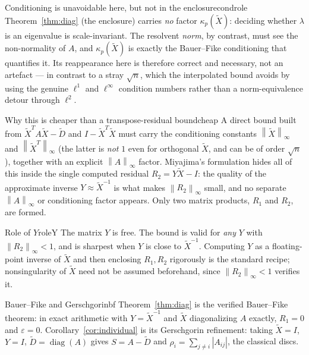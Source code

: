\documentclass[11pt, a4paper]{article}
\numberwithin{equation}{section}
\newcommand{\norm}[1]{\left\|#1\right\|}
\newcommand{\abs}[1]{\left|#1\right|}
\newcommand{\tX}{\widetilde{X}}
\newcommand{\tD}{\widetilde{D}}
\begin{document}
\begin{remark}{Conditioning is unavoidable here, but not in the enclosure}{condrole}
  Theorem~\ref{thm:diag} (the enclosure) carries \emph{no} factor
  $\kappa_p(\tX)$: deciding whether $\lambda$ is an eigenvalue is
  scale-invariant.  The resolvent \emph{norm}, by contrast, must see the
  non-normality of $A$, and $\kappa_p(\tX)$ is exactly the Bauer--Fike
  conditioning that quantifies it.  Its reappearance here is therefore correct
  and necessary, not an artefact --- in contrast to a stray $\sqrt n$, which
  the interpolated bound avoids by using the genuine $\ell^1$ and $\ell^\infty$
  condition numbers rather than a norm-equivalence detour through $\ell^2$.
\end{remark}



\begin{remark}{Why this is cheaper than a transpose-residual bound}{cheap}
  A direct bound built from $\tX^T A \tX - \tD$ and $I - \tX^T\tX$ must carry
  the conditioning constants $\norm{\tX}_\infty$ and $\norm{\tX^T}_\infty$ (the
  latter is \emph{not} $1$ even for orthogonal $\tX$, and can be of order
  $\sqrt n$), together with an explicit $\norm{A}_\infty$ factor.  Miyajima's
  formulation hides all of this inside the single computed residual $R_2 = Y\tX
  - I$: the quality of the approximate inverse $Y \approx \tX^{-1}$ is what
  makes $\norm{R_2}_\infty$ small, and no separate $\norm{A}_\infty$ or
  conditioning factor appears.  Only two matrix products, $R_1$ and $R_2$, are
  formed.
\end{remark}

\begin{remark}{Role of $Y$}{roleY}
  The matrix $Y$ is free.  The bound is valid for \emph{any} $Y$ with
  $\norm{R_2}_\infty < 1$, and is sharpest when $Y$ is close to $\tX^{-1}$.
  Computing $Y$ as a floating-point inverse of $\tX$ and then enclosing $R_1,
  R_2$ rigorously is the standard recipe; nonsingularity of $\tX$ need not be
  assumed beforehand, since $\norm{R_2}_\infty < 1$ verifies it.
\end{remark}

\begin{remark}{Bauer--Fike and Gerschgorin}{bf}
  Theorem~\ref{thm:diag} is the verified Bauer--Fike theorem: in exact
  arithmetic with $Y = \tX^{-1}$ and $\tX$ diagonalizing $A$ exactly, $R_1 = 0$
  and $\varepsilon = 0$.  Corollary~\ref{cor:individual} is its Gerschgorin
  refinement: taking $\tX = I$, $Y = I$, $\tD = \operatorname{diag}(A)$ gives $S
  = A - \tD$ and $\rho_i = \sum_{j\ne i}\abs{A_{ij}}$, the classical discs.
\end{remark}
\end{document}
